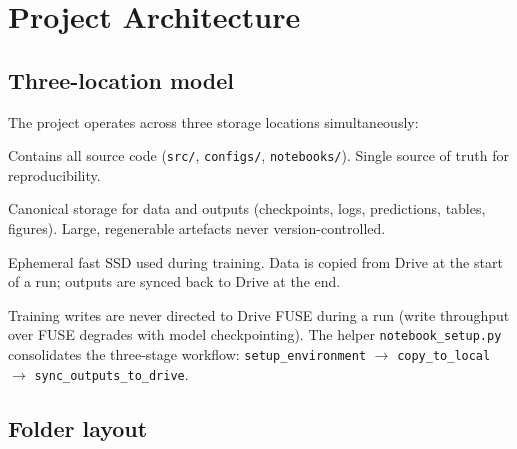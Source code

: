 \documentclass[12pt,a4paper]{article}
\begin{document}
\section{Project Architecture}

\subsection{Three-location model}

The project operates across three storage locations simultaneously:

\begin{description}[leftmargin=2.5em]
  \item[GitHub] Contains all source code (\texttt{src/}, \texttt{configs/},
    \texttt{notebooks/}).  Single source of truth for reproducibility.
  \item[Google Drive] Canonical storage for data and outputs (checkpoints, logs,
    predictions, tables, figures).  Large, regenerable artefacts never version-controlled.
  \item[Colab runtime] Ephemeral fast SSD used during training.  Data is copied
    from Drive at the start of a run; outputs are synced back to Drive at the end.
\end{description}

Training writes are never directed to Drive FUSE during a run (write throughput
over FUSE degrades with model checkpointing).  The helper
\texttt{notebook\_setup.py} consolidates the three-stage workflow:
\texttt{setup\_environment} $\to$ \texttt{copy\_to\_local} $\to$
\texttt{sync\_outputs\_to\_drive}.

\subsection{Folder layout}
\end{document}
